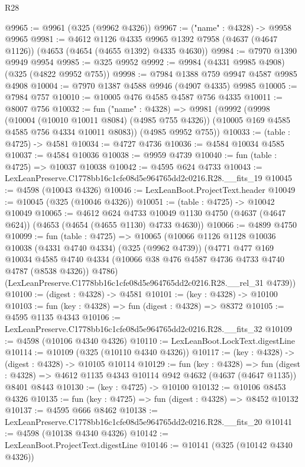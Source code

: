 \begin{lexlean}{R28}
\begin{coremodule}
@9965 := @9961 (@325 (@9962 @4326))
@9967 := ("name" : @4328) -> @9958 @9965
@9981 := @4612
    @1126
    @4335
    @9965
    @1392
    @7958
    (@4637 (@4647 @1126))
    (@4653 (@4654 (@4655 @1392) @4335 @4630))
@9984 := @7970 @1390 @9949 @9954
@9985 := @325 @9952
@9992 := @9984 (@4331 @9985 @4908) (@325 (@4822 @9952 @755))
@9998 := @7984 @1388 @759 @9947 @4587 @9985 @4908
@10004 := @7970 @1387 @4588 @9946 (@4907 @4335) @9985
@10005 := @7984 @757
@10010 := @10005 @476 @4585 @4587 @756 @4335
@10011 := @8007 @756
@10032 := fun ("name" : @4328) =>
  @9981
    (@9992
      (@9998
        (@10004 (@10010 @10011 @8084) (@4985 @755 @4326))
        (@10005 @169 @4585 @4585 @756 @4334 @10011 @8083))
      (@4985 @9952 @755))
@10033 := (table : @4725) -> @4581
@10034 := @4727 @4736
@10036 := @4584 @10034 @4585
@10037 := @4584 @10036
@10038 := @9959 @4739
@10040 := fun (table : @4725) => @10037 @10038
@10042 := @4595 @624 @4733
@10043 := LexLeanPreserve.C1778bb16c1cfe08d5e964765dd2c0216.R28.__fits_19
@10045 := @4598 (@10043 @4326)
@10046 := LexLeanBoot.ProjectText.header
@10049 := @10045 (@325 (@10046 @4326))
@10051 := (table : @4725) -> @10042 @10049
@10065 := @4612
    @624
    @4733
    @10049
    @1130
    @4750
    (@4637 (@4647 @624))
    (@4653 (@4654 (@4655 @1130) @4733 @4630))
@10066 := @4899 @4750
@10099 := fun (table : @4725) =>
  @10065
    (@10066
      @1126
      @1128
      @10036
      @10038
      (@4331 @4740 @4334)
      (@325 (@9962 @4739))
      (@4771
        @477
        @169
        @10034
        @4585
        @4740
        @4334
        (@10066 @38 @476 @4587 @4736 @4733 @4740 @4787 (@8538 @4326))
        @4786)
      (LexLeanPreserve.C1778bb16c1cfe08d5e964765dd2c0216.R28.__rel_31 @4739))
@10100 := (digest : @4328) -> @4581
@10101 := (key : @4328) -> @10100
@10103 := fun (key : @4328) => fun (digest : @4328) => @8372
@10105 := @4595 @1135 @4343
@10106 := LexLeanPreserve.C1778bb16c1cfe08d5e964765dd2c0216.R28.__fits_32
@10109 := @4598 (@10106 @4340 @4326)
@10110 := LexLeanBoot.LockText.digestLine
@10114 := @10109 (@325 (@10110 @4340 @4326))
@10117 := (key : @4328) -> (digest : @4328) -> @10105 @10114
@10129 := fun (key : @4328) =>
  fun (digest : @4328) => @4612 @1135 @4343 @10114 @942 @4632 (@4637 (@4647 @1135)) @8401 @8443
@10130 := (key : @4725) -> @10100
@10132 := @10106 @8453 @4326
@10135 := fun (key : @4725) => fun (digest : @4328) => @8452 @10132
@10137 := @4595 @666 @8462
@10138 := LexLeanPreserve.C1778bb16c1cfe08d5e964765dd2c0216.R28.__fits_20
@10141 := @4598 (@10138 @4340 @4326)
@10142 := LexLeanBoot.ProjectText.digestLine
@10146 := @10141 (@325 (@10142 @4340 @4326))

\end{coremodule}
\end{lexlean}
